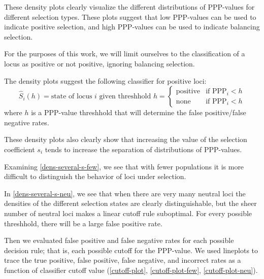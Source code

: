 \documentclass[a4paper,12pt]{article}
\begin{document}



These density plots clearly visualize the different distributions of
PPP-values for different selection types. These plots suggest that low
PPP-values can be used to indicate positive selection, and high
PPP-values can be used to indicate balancing selection.

For the purposes of this work, we will limit ourselves to the
classification of a locus as positive or not positive, ignoring
balancing selection.

The density plots suggest the following classifier for positive loci:
$$\hat{S}_{i}(h)=\text{state of locus $i$ given threshhold $h$} = 
\begin{cases}
  \text{positive} & \text{if PPP}_i<h\\
  \text{none}     & \text{if PPP}_i<h
\end{cases}
$$
where $h$ is a PPP-value threshhold that will determine the false
positive/false negative rates.

These density plots also clearly show that increasing the value of the
selection coefficient $s_i$ tends to increase the separation of
distributions of PPP-values.

Examining \autoref{dens-several-s-few}, we see that with fewer
populations it is more difficult to distinguish the behavior of loci
under selection.

In \autoref{dens-several-s-neu}, we see that when there are very many
neutral loci the densities of the different selection states are
clearly distinguishable, but the sheer number of neutral loci makes a
linear cutoff rule suboptimal. For every possible threshhold, there
will be a large false positive rate.

Then we evaluated false positive and false negative rates for each
possible decision rule; that is, each possible cutoff for the
PPP-value. We used lineplots to trace the true positive, false
positive, false negative, and incorrect rates as a function of
classifier cutoff value (\autoref{cutoff-plot},
\autoref{cutoff-plot-few}, \autoref{cutoff-plot-neu}).
\end{document}
